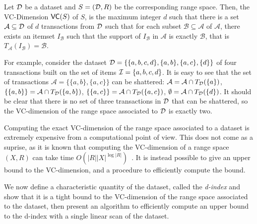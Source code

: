 \begin{corollary} Let ${\cal D}$ be a dataset and $S=({\cal D},R)$ be the corresponding
  range space. Then, the VC-Dimension $\mathsf{VC}(S)$ of $S$, is the maximum integer
  $d$ such that there is a set $\mathcal{A}\subseteq{\cal D}$ of $d$ transactions
  from ${\cal D}$ such that for each subset $\mathcal{B}\subseteq\mathcal{A}$ of
  $\mathcal{A}$, there exists an itemset $I_\mathcal{B}$ such that the support
  of $I_\mathcal{B}$ in $\mathcal{A}$ is exactly $\mathcal{B}$, that is
  $T_\mathcal{A}(I_\mathcal{B})=\mathcal{B}$.
\end{corollary}

For example, consider the dataset ${\cal D}=\{\{a,b,c,d\},\{a,b\},\{a,c\},\{d\}\}$ of
four transactions built on the set of items ${\cal I}=\{a,b,c,d\}$. It is easy to see
that the set of transactions $\mathcal{A}=\{\{a,b\},\{a,c\}\}$ can be shattered:
$\mathcal{A}=\mathcal{A}\cap T_{\cal D}(\{a\})$, $\{\{a,b\}\}=\mathcal{A}\cap
T_{\cal D}(\{a,b\})$, $\{\{a,c\}\}=\mathcal{A}\cap T_{\cal D}(\{a,c\})$,
$\emptyset=\mathcal{A}\cap T_{\cal D}(\{d\})$. It should be clear that there is no
set of three transactions in ${\cal D}$ that can be shattered, so the VC-dimension of
the range space associated to ${\cal D}$ is exactly two.

Computing the exact VC-dimension of the range space associated to a dataset is
extremely expensive from a computational point of view. This does not come as a
suprise, as it is known that computing the VC-dimension of a range space $(X,R)$
can take time $O(|R||X|^{\log|R|})$~\cite[Thm.~4.1]{LinialMR91}. It is instead
possible to give an upper bound to the VC-dimension, and a procedure to
efficiently compute the bound.

We now define a characteristic quantity of the dataset, called the
\emph{d-index} and show that it is a tight bound to the VC-dimension of the
range space associated to the dataset, then present an algorithm to efficiently
compute an upper bound to the d-index with a single linear scan of the dataset.

